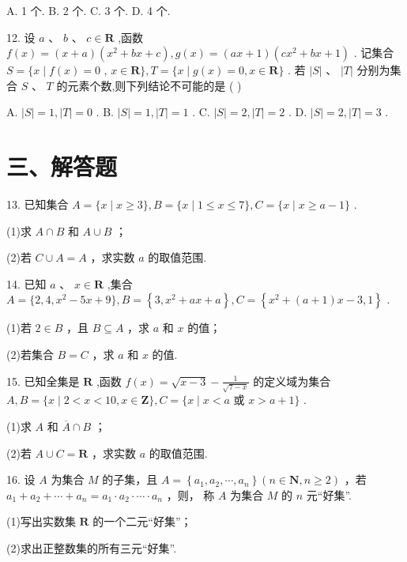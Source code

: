 A. 1 个. B. 2 个. C. 3 个. D. 4 个.

12. 设 $a$ 、 $b$ 、 $c \in  \mathbf{R}$ ,函数 $f\left( x\right)  = \left( {x + a}\right) \left( {{x}^{2} + {bx} + c}\right) ,g\left( x\right)  = \left( {{ax} + 1}\right) \left( {c{x}^{2} + {bx} + 1}\right)$ . 记集合 $S = \{ x \mid  f\left( x\right)  = 0$ , $x \in  \mathbf{R}\} ,T = \{ x \mid  g\left( x\right)  = 0,x \in  \mathbf{R}\}$ . 若 $\left| S\right| \text{ 、 }\left| T\right|$ 分别为集合 $S\text{ 、 }T$ 的元素个数,则下列结论不可能的是 ( )

A. $\left| S\right|  = 1,\left| T\right|  = 0$ . B. $\left| S\right|  = 1,\left| T\right|  = 1$ . C. $\left| S\right|  = 2,\left| T\right|  = 2$ . D. $\left| S\right|  = 2,\left| T\right|  = 3$ .

\section*{三、解答题}

13. 已知集合 $A = \{ x \mid  x \geq  3\} ,B = \{ x \mid  1 \leq  x \leq  7\} ,C = \{ x \mid  x \geq  a - 1\}$ .

(1)求 $A \cap  B$ 和 $A \cup  B$ ；

(2)若 $C \cup  A = A$ ，求实数 $a$ 的取值范围.

14. 已知 $a\text{ 、 }x \in  \mathbf{R}$ ,集合 $A = \{ 2,4,{x}^{2} - {5x} + 9\} ,B = \left\{  {3,{x}^{2} + {ax} + a}\right\}  ,C = \left\{  {{x}^{2} + \left( {a + 1}\right) x - 3,1}\right\}$ .

(1)若 $2 \in  B$ ，且 $B \subseteq  A$ ，求 $a$ 和 $x$ 的值；

(2)若集合 $B = C$ ，求 $a$ 和 $x$ 的值.

15. 已知全集是 $\mathbf{R}$ ,函数 $f\left( x\right)  = \sqrt{x - 3} - \frac{1}{\sqrt{7 - x}}$ 的定义域为集合 $A,B = \{ x \mid  2 < x < {10},x \in  \mathbf{Z}\} ,C = \{ x \mid  x < a$ 或 $x > a + 1\}$ .

(1)求 $A$ 和 $\overline{A} \cap  B$ ；

(2)若 $A \cup  C = \mathbf{R}$ ，求实数 $a$ 的取值范围.

16. 设 $A$ 为集合 $M$ 的子集，且 $A = \left\{  {{a}_{1},{a}_{2},\cdots ,{a}_{n}}\right\}  \left( {n \in  \mathbf{N},n \geq  2}\right)$ ，若 ${a}_{1} + {a}_{2} + \cdots  + {a}_{n} = {a}_{1} \cdot  {a}_{2} \cdot  \cdots  \cdot  {a}_{n}$ ，则， 称 $A$ 为集合 $M$ 的 $n$ 元“好集”.

(1)写出实数集 $\mathbf{R}$ 的一个二元“好集”；

(2)求出正整数集的所有三元“好集”.

